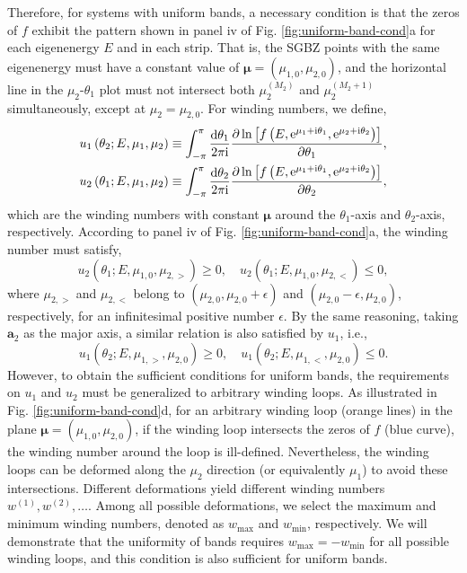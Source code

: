 Therefore, for systems with uniform bands, a necessary condition is
that the zeros of $f$ exhibit the pattern shown in panel iv of Fig.
\ref{fig:uniform-band-cond}a for each eigenenergy $E$ and in each
strip. That is, the SGBZ points with the same eigenenergy must have
a constant value of $\boldsymbol{\mu}=(\mu_{1,0},\mu_{2,0})$, and
the horizontal line in the $\mu_{2}$-$\theta_{1}$ plot must not
intersect both $\mu_{2}^{(M_{2})}$ and $\mu_{2}^{(M_{2}+1)}$ simultaneously,
except at $\mu_{2}=\mu_{2,0}$. For winding numbers, we define, 
\begin{align}
u_{1}\left(\theta_{2};E,\mu_{1},\mu_{2}\right) & \equiv\int_{-\pi}^{\pi}\frac{\mathrm{d}\theta_{1}}{2\pi\mathrm{i}}\frac{\partial\ln\left[f\left(E,\mathrm{e}^{\mu_{1}+\mathrm{i}\theta_{1}},\mathrm{e}^{\mu_{2}+\mathrm{i}\theta_{2}}\right)\right]}{\partial\theta_{1}},\\
u_{2}\left(\theta_{1};E,\mu_{1},\mu_{2}\right) & \equiv\int_{-\pi}^{\pi}\frac{\mathrm{d}\theta_{2}}{2\pi\mathrm{i}}\frac{\partial\ln\left[f\left(E,\mathrm{e}^{\mu_{1}+\mathrm{i}\theta_{1}},\mathrm{e}^{\mu_{2}+\mathrm{i}\theta_{2}}\right)\right]}{\partial\theta_{2}},
\end{align}
which are the winding numbers with constant $\boldsymbol{\mu}$ around
the $\theta_{1}$-axis and $\theta_{2}$-axis, respectively. According
to panel iv of Fig. \ref{fig:uniform-band-cond}a, the winding number
must satisfy, 
\begin{equation}
u_{2}\left(\theta_{1};E,\mu_{1,0},\mu_{2,>}\right)\geq0,\quad u_{2}\left(\theta_{1};E,\mu_{1,0},\mu_{2,<}\right)\leq0,
\end{equation}
where $\mu_{2,>}$ and $\mu_{2,<}$ belong to $(\mu_{2,0},\mu_{2,0}+\epsilon)$
and $(\mu_{2,0}-\epsilon,\mu_{2,0})$, respectively, for an infinitesimal
positive number $\epsilon$. By the same reasoning, taking $\mathbf{a}_{2}$
as the major axis, a similar relation is also satisfied by $u_{1}$,
i.e., 
\begin{equation}
u_{1}\left(\theta_{2};E,\mu_{1,>},\mu_{2,0}\right)\geq0,\quad u_{1}\left(\theta_{2};E,\mu_{1,<},\mu_{2,0}\right)\leq0.
\end{equation}
However, to obtain the sufficient conditions for uniform bands, the
requirements on $u_{1}$ and $u_{2}$ must be generalized to arbitrary
winding loops. As illustrated in Fig. \ref{fig:uniform-band-cond}d,
for an arbitrary winding loop (orange lines) in the plane $\boldsymbol{\mu}=(\mu_{1,0},\mu_{2,0})$,
if the winding loop intersects the zeros of $f$ (blue curve), the
winding number around the loop is ill-defined. Nevertheless, the winding
loops can be deformed along the $\mu_{2}$ direction (or equivalently
$\mu_{1}$) to avoid these intersections. Different deformations yield
different winding numbers $w^{(1)},w^{(2)},\dots$. Among all possible
deformations, we select the maximum and minimum winding numbers, denoted
as $w_{\text{max}}$ and $w_{\text{min}}$, respectively. We will
demonstrate that the uniformity of bands requires $w_{\text{max}}=-w_{\text{min}}$
for all possible winding loops, and this condition is also sufficient
for uniform bands.

